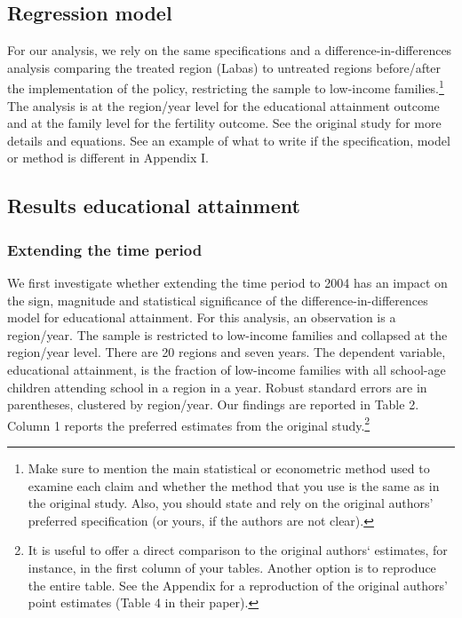 \documentclass[12pt,a4paper]{article}
\begin{document}
\subsection{Regression model}

For our analysis, we rely on the same specifications and a difference-in-differences analysis comparing the treated region (Labas) to untreated regions before/after the implementation of the policy, restricting the sample to low-income families.\footnote{Make sure to mention the main statistical or econometric method used to examine each claim and whether the method that you use is the same as in the original study. Also, you should state and rely on the original authors’ preferred specification (or yours, if the authors are not clear).} The analysis is at the region/year level for the educational attainment outcome and at the family level for the fertility outcome. See the original study for more details and equations. See an example of what to write if the specification, model or method is different in Appendix I.

\subsection{Results educational attainment}

\subsubsection{Extending the time period}

We first investigate whether extending the time period to 2004 has an impact on the sign, magnitude and statistical significance of the difference-in-differences model for educational attainment. For this analysis, an observation is a region/year. The sample is restricted to low-income families and collapsed at the region/year level. There are 20 regions and seven years. The dependent variable, educational attainment, is the fraction of low-income families with all school-age children attending school in a region in a year. Robust standard errors are in parentheses, clustered by region/year. Our findings are reported in Table 2. Column 1 reports the preferred estimates from the original study.\footnote{It is useful to offer a direct comparison to the original authors‘ estimates, for instance, in the first column of your tables. Another option is to reproduce the entire table. See the Appendix for a reproduction of the original authors’ point estimates (Table 4 in their paper).}
\end{document}
